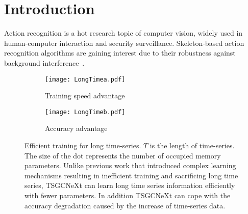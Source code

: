 \documentclass[10pt,twocolumn,letterpaper]{article}
\begin{document}
\section{Introduction}
\label{sec:introduction}
Action recognition is a hot research topic of computer vision, widely used in human-computer interaction and security surveillance. Skeleton-based action recognition algorithms are gaining interest due to their robustness against background interference~\cite{weinland2011survey}. 

\begin{figure}\centering
     \begin{subfigure}[b]{0.235\textwidth}
         \centering
         \texttt{[image: LongTimea.pdf]}
         \caption{Training speed advantage}
         \label{1(a)}
    \end{subfigure}
    \begin{subfigure}[b]{0.235\textwidth}
         \centering
         \texttt{[image: LongTimeb.pdf]}
         \caption{Accuracy advantage}
         \label{1(b)}
    \end{subfigure}
    \caption{Efficient training for long time-series. $T$ is the length of time-series. The size of the dot represents the number of occupied memory parameters. Unlike previous work that introduced complex learning mechanisms resulting in inefficient training and sacrificing long time series, TSGCNeXt can learn long time series information efficiently with fewer parameters. In addition TSGCNeXt can cope with the accuracy degradation caused by the increase of time-series data.}
    \label{fig:longtime}
    \vspace{-1em}
\end{figure}
\end{document}
